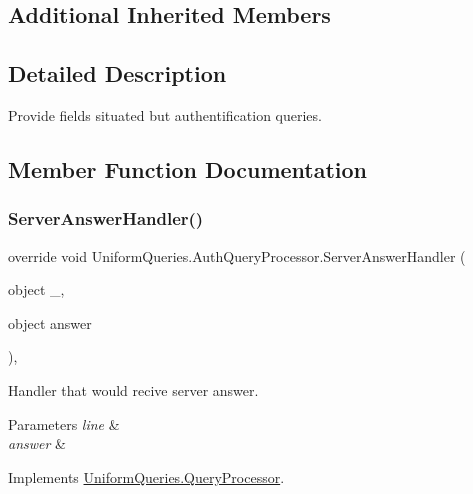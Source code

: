 \subsection*{Additional Inherited Members}


\subsection{Detailed Description}
Provide fields situated but authentification queries. 



\subsection{Member Function Documentation}
\mbox{\label{class_uniform_queries_1_1_auth_query_processor_a09d3f6d361c09c0726a880a92191f3fd}} 
\subsubsection{\texorpdfstring{Server\+Answer\+Handler()}{ServerAnswerHandler()}}
{\footnotesize\ttfamily override void Uniform\+Queries.\+Auth\+Query\+Processor.\+Server\+Answer\+Handler (\begin{DoxyParamCaption}\item[{object}]{\+\_\+,  }\item[{object}]{answer }\end{DoxyParamCaption})\hspace{0.3cm}{\ttfamily [protected]}, {\ttfamily [virtual]}}



Handler that would recive server answer. 


\begin{DoxyParams}{Parameters}
{\em line} & \\
\hline
{\em answer} & \\
\hline
\end{DoxyParams}


Implements \mbox{\hyperlink{class_uniform_queries_1_1_query_processor_ac0726166f2db4a9063024e4db190bd82}{Uniform\+Queries.\+Query\+Processor}}.



